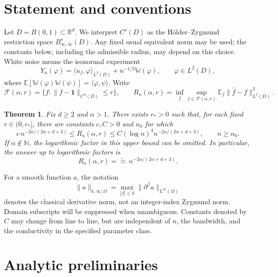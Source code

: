 \documentclass[11pt]{article}
\newtheorem{theorem}{Theorem}[section]
\theoremstyle{remark}
\newcommand{\R}{\mathbb R}
\newcommand{\E}{\mathbb E}
\newcommand{\one}{\mathbf 1}
\newcommand{\cF}{\mathcal F}
\begin{document}
\section{Statement and conventions}

Let \(D=B(0,1)\subset\R^d\). We interpret \(C^s(D)\) as the
H\"older--Zygmund restriction space \(B^s_{\infty,\infty}(D)\).
Any fixed usual equivalent norm may be used; the constants below,
including the admissible radius, may depend on this choice.
White noise means the isonormal experiment
\[
Y_n(\varphi)=\langle u_f,\varphi\rangle_{L^2(D)}
+n^{-1/2}\mathbb W(\varphi),\qquad \varphi\in L^2(D),
\]
where
\(\E[\mathbb W(\varphi)\mathbb W(\psi)]=\langle\varphi,\psi\rangle\).
Write
\[
\cF(\alpha,r)=
\{f:\|f-\one\|_{C^\alpha(D)}\leq r\},
\qquad
R_n(\alpha,r)=
\inf_{\widehat f}\sup_{f\in\cF(\alpha,r)}
\E_f\|\widehat f-f\|_{L^2(D)}^2.
\]

\begin{theorem}\label{thm:main}
Fix \(d\geq2\) and \(\alpha>1\). There exists \(r_*>0\) such that,
for each fixed \(r\in(0,r_*]\), there are constants
\(c,C>0\) and \(n_0\) for which
\[
c\,n^{-2\alpha/(2\alpha+d+3)}
\leq R_n(\alpha,r)
\leq
C(\log n)^4 n^{-2\alpha/(2\alpha+d+3)},
\qquad n\geq n_0.
\]
If \(\alpha\notin\mathbb N\), the logarithmic factor in this upper bound
can be omitted. In particular, the answer up to logarithmic factors is
\[
\boxed{\displaystyle
R_n(\alpha,r)=\widetilde{\asymp}\,
n^{-2\alpha/(2\alpha+d+3)}.}
\]
\end{theorem}
For a smooth function \(a\), the notation
\[
\|a\|_{k,\infty;\Omega}
=\max_{|\beta|\leq k}\|\partial^\beta a\|_{L^\infty(\Omega)}
\]
denotes the classical derivative norm, not an integer-index Zygmund
norm. Domain subscripts will be suppressed when unambiguous.
Constants denoted by \(C\) may change from line to line, but are
independent of \(n\), the bandwidth, and the conductivity in the
specified parameter class.


\section{Analytic preliminaries}
\end{document}
